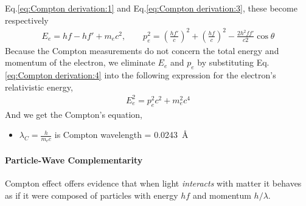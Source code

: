     Eq.\eqref{eq:Compton derivation:1} and Eq.\eqref{eq:Compton derivation:3}, these become respectively
    \begin{align}
        \label{eq:Compton derivation:5}
        E_e = hf - hf' + m_e c^2, \qquad 
        p_e^2 = \left(\frac{hf'}{c}\right)^2 + \left(\frac{hf}{c}\right)^2 - \frac{2 h^2 f f' }{c2} \cos{\theta}
    \end{align}
    Because the Compton measurements do not concern the total energy and momentum of the electron, 
    we eliminate $E_e$ and $p_e$ by substituting Eq.\eqref{eq:Compton derivation:4} into the following expression for 
    the electron’s relativistic energy,
    \begin{align}
        \label{eq:C}
        E_e^2 = p_e^2c^2 + m_e^2 c^4
    \end{align}
    And we get the Compton's equation,
    {\tiny \begin{itemize}
        \item $\lambda_C = \frac{h}{m_e c}$ is Compton wavelength = \SI{0.0243}{\AA}
    \end{itemize}}

    \paragraph{Particle-Wave Complementarity} %
    \label{par:Particle-Wave Complementarity}
    Compton effect offers evidence that when light \textit{interacts} with matter it behaves as if it were composed 
    of particles with energy $hf$ and momentum $h/\lambda$.
